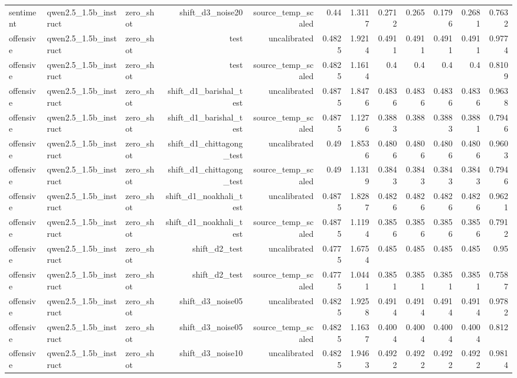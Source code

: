 \begin{table}[htbp]
{\begin{tabular}{lllrrrrrrrrr}
sentiment & qwen2.5\_1.5b\_instruct & zero\_shot & shift\_d3\_noise20 & source\_temp\_scaled & 0.44 & 1.3117 & 0.2712 & 0.265 & 0.1796 & 0.2681 & 0.7632 \\
offensive & qwen2.5\_1.5b\_instruct & zero\_shot & test & uncalibrated & 0.4825 & 1.9214 & 0.4911 & 0.4911 & 0.4911 & 0.4911 & 0.9774 \\
offensive & qwen2.5\_1.5b\_instruct & zero\_shot & test & source\_temp\_scaled & 0.4825 & 1.1614 & 0.4 & 0.4 & 0.4 & 0.4 & 0.8109 \\
offensive & qwen2.5\_1.5b\_instruct & zero\_shot & shift\_d1\_barishal\_test & uncalibrated & 0.4875 & 1.8476 & 0.4836 & 0.4836 & 0.4836 & 0.4836 & 0.9638 \\
offensive & qwen2.5\_1.5b\_instruct & zero\_shot & shift\_d1\_barishal\_test & source\_temp\_scaled & 0.4875 & 1.1276 & 0.3883 & 0.388 & 0.3883 & 0.3881 & 0.7946 \\
offensive & qwen2.5\_1.5b\_instruct & zero\_shot & shift\_d1\_chittagong\_test & uncalibrated & 0.49 & 1.8536 & 0.4806 & 0.4806 & 0.4806 & 0.4806 & 0.9603 \\
offensive & qwen2.5\_1.5b\_instruct & zero\_shot & shift\_d1\_chittagong\_test & source\_temp\_scaled & 0.49 & 1.1319 & 0.3843 & 0.3843 & 0.3843 & 0.3843 & 0.7946 \\
offensive & qwen2.5\_1.5b\_instruct & zero\_shot & shift\_d1\_noakhali\_test & uncalibrated & 0.4875 & 1.8287 & 0.4826 & 0.4826 & 0.4826 & 0.4826 & 0.9621 \\
offensive & qwen2.5\_1.5b\_instruct & zero\_shot & shift\_d1\_noakhali\_test & source\_temp\_scaled & 0.4875 & 1.1194 & 0.3856 & 0.3856 & 0.3856 & 0.3856 & 0.7912 \\
offensive & qwen2.5\_1.5b\_instruct & zero\_shot & shift\_d2\_test & uncalibrated & 0.4775 & 1.6754 & 0.485 & 0.485 & 0.485 & 0.485 & 0.95 \\
offensive & qwen2.5\_1.5b\_instruct & zero\_shot & shift\_d2\_test & source\_temp\_scaled & 0.4775 & 1.0441 & 0.3851 & 0.3851 & 0.3851 & 0.3851 & 0.7587 \\
offensive & qwen2.5\_1.5b\_instruct & zero\_shot & shift\_d3\_noise05 & uncalibrated & 0.4825 & 1.9258 & 0.4914 & 0.4914 & 0.4914 & 0.4914 & 0.9782 \\
offensive & qwen2.5\_1.5b\_instruct & zero\_shot & shift\_d3\_noise05 & source\_temp\_scaled & 0.4825 & 1.1637 & 0.4004 & 0.4004 & 0.4004 & 0.4004 & 0.812 \\
offensive & qwen2.5\_1.5b\_instruct & zero\_shot & shift\_d3\_noise10 & uncalibrated & 0.4825 & 1.9463 & 0.4922 & 0.4922 & 0.4922 & 0.4922 & 0.9814 \\

\end{tabular}}
\end{table}

